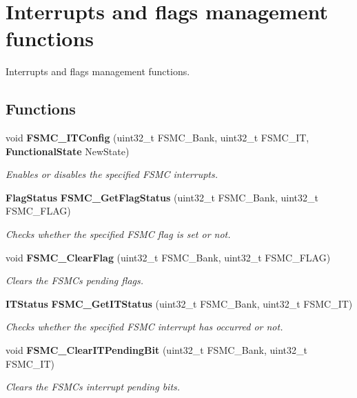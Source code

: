 \section{Interrupts and flags management functions}
\label{group__FSMC__Group4}


Interrupts and flags management functions.  


\subsection*{Functions}
\begin{DoxyCompactItemize}
\item 
void \textbf{ F\+S\+M\+C\+\_\+\+I\+T\+Config} (uint32\+\_\+t F\+S\+M\+C\+\_\+\+Bank, uint32\+\_\+t F\+S\+M\+C\+\_\+\+IT, \textbf{ Functional\+State} New\+State)
\begin{DoxyCompactList}\small\item\em Enables or disables the specified F\+S\+MC interrupts. \end{DoxyCompactList}\item 
\textbf{ Flag\+Status} \textbf{ F\+S\+M\+C\+\_\+\+Get\+Flag\+Status} (uint32\+\_\+t F\+S\+M\+C\+\_\+\+Bank, uint32\+\_\+t F\+S\+M\+C\+\_\+\+F\+L\+AG)
\begin{DoxyCompactList}\small\item\em Checks whether the specified F\+S\+MC flag is set or not. \end{DoxyCompactList}\item 
void \textbf{ F\+S\+M\+C\+\_\+\+Clear\+Flag} (uint32\+\_\+t F\+S\+M\+C\+\_\+\+Bank, uint32\+\_\+t F\+S\+M\+C\+\_\+\+F\+L\+AG)
\begin{DoxyCompactList}\small\item\em Clears the F\+S\+MC\textquotesingle{}s pending flags. \end{DoxyCompactList}\item 
\textbf{ I\+T\+Status} \textbf{ F\+S\+M\+C\+\_\+\+Get\+I\+T\+Status} (uint32\+\_\+t F\+S\+M\+C\+\_\+\+Bank, uint32\+\_\+t F\+S\+M\+C\+\_\+\+IT)
\begin{DoxyCompactList}\small\item\em Checks whether the specified F\+S\+MC interrupt has occurred or not. \end{DoxyCompactList}\item 
void \textbf{ F\+S\+M\+C\+\_\+\+Clear\+I\+T\+Pending\+Bit} (uint32\+\_\+t F\+S\+M\+C\+\_\+\+Bank, uint32\+\_\+t F\+S\+M\+C\+\_\+\+IT)
\begin{DoxyCompactList}\small\item\em Clears the F\+S\+MC\textquotesingle{}s interrupt pending bits. \end{DoxyCompactList}\end{DoxyCompactItemize}


